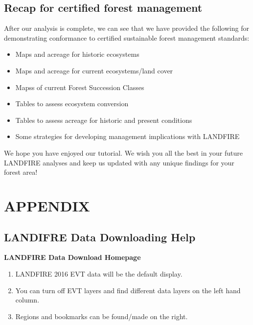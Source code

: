 \documentclass[
]{book}
\providecommand{\tightlist}{%
  \setlength{\itemsep}{0pt}\setlength{\parskip}{0pt}}
\begin{document}
\hypertarget{recap-for-certified-forest-management}{%
\section{Recap for certified forest management}\label{recap-for-certified-forest-management}}

After our analysis is complete, we can see that we have provided the following for demonstrating conformance to certified sustainable forest management standards:

\begin{itemize}
\tightlist
\item
  Maps and acreage for historic ecosystems
\item
  Maps and acreage for current ecosystems/land cover
\item
  Mapss of current Forest Succession Classes
\item
  Tables to assess ecosystem conversion
\item
  Tables to assess acreage for historic and present conditions
\item
  Some strategies for developing management implications with LANDFIRE
\end{itemize}

We hope you have enjoyed our tutorial. We wish you all the best in your future LANDFIRE analyses and keep us updated with any unique findings for your forest area!

\hypertarget{appendix}{%
\chapter{APPENDIX}\label{appendix}}

\hypertarget{landifre-data-downloading-help}{%
\section{LANDIFRE Data Downloading Help}\label{landifre-data-downloading-help}}

\textbf{LANDFIRE Data Download Homepage}

\begin{enumerate}
\def\labelenumi{\arabic{enumi}.}
\tightlist
\item
  LANDFIRE 2016 EVT data will be the default display.
\item
  You can turn off EVT layers and find different data layers on the left hand column.
\item
  Regions and bookmarks can be found/made on the right.
\end{enumerate}
\end{document}
